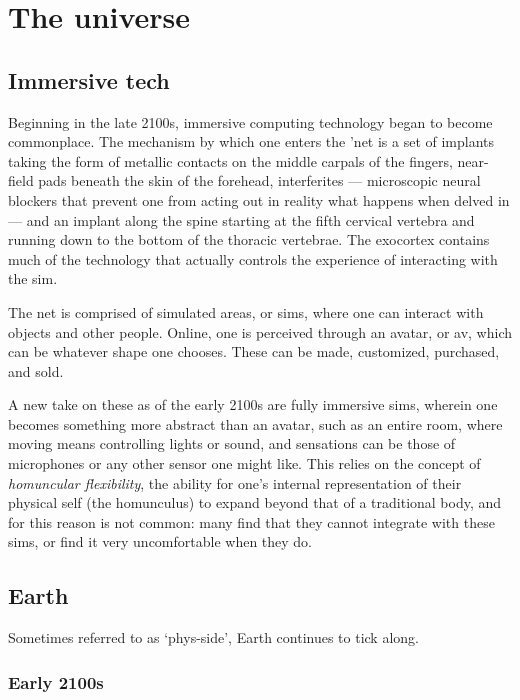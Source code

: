 \section*{The universe}

\subsection{Immersive tech}

Beginning in the late 2100s, immersive computing technology began to become commonplace. The mechanism by which one enters the 'net is a set of implants taking the form of metallic contacts on the middle carpals of the fingers, near-field pads beneath the skin of the forehead, interferites --- microscopic neural blockers that prevent one from acting out in reality what happens when delved in --- and an implant along the spine starting at the fifth cervical vertebra and running down to the bottom of the thoracic vertebrae. The exocortex contains much of the technology that actually controls the experience of interacting with the sim.

The net is comprised of simulated areas, or sims, where one can interact with objects and other people. Online, one is perceived through an avatar, or av, which can be whatever shape one chooses. These can be made, customized, purchased, and sold.

A new take on these as of the early 2100s are fully immersive sims, wherein one becomes something more abstract than an avatar, such as an entire room, where moving means controlling lights or sound, and sensations can be those of microphones or any other sensor one might like. This relies on the concept of \emph{homuncular flexibility}, the ability for one's internal representation of their physical self (the homunculus) to expand beyond that of a traditional body, and for this reason is not common: many find that they cannot integrate with these sims, or find it very uncomfortable when they do.

\vspace{-0.5em}

\subsection{Earth}

Sometimes referred to as `phys-side', Earth continues to tick along.

\vspace{-0.5em}

\subsubsection{Early 2100s}

